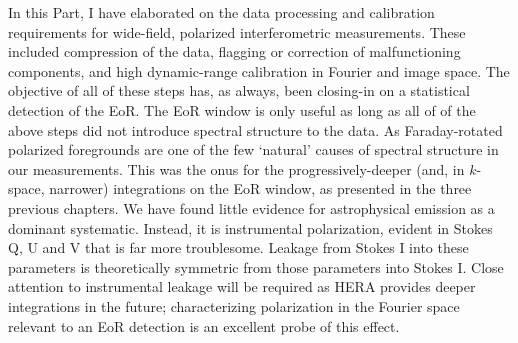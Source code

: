In this Part, I have elaborated on the data processing and calibration requirements for wide-field, polarized interferometric measurements. These included compression of the data, flagging or correction of malfunctioning components, and high dynamic-range calibration in Fourier and image space. The objective of all of these steps has, as always, been closing-in on a statistical detection of the EoR. The EoR window is only useful as long as all of of the above steps did not introduce spectral structure to the data. As Faraday-rotated polarized foregrounds are one of the few `natural' causes of spectral structure in our measurements. This was the onus for the progressively-deeper (and, in $k$-space, narrower) integrations on the EoR window, as presented in the three previous chapters. We have found little evidence for astrophysical emission as a dominant systematic. Instead, it is instrumental polarization, evident in Stokes Q, U and V that is far more troublesome. Leakage from Stokes I into these parameters is theoretically symmetric from those parameters into Stokes I. Close attention to instrumental leakage will be required as HERA provides deeper integrations in the future; characterizing polarization in the Fourier space relevant to an EoR detection is an excellent probe of this effect. 